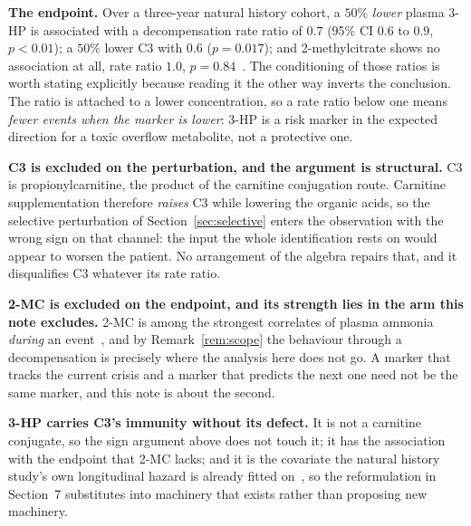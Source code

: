 \textbf{The endpoint.} Over a three-year natural history cohort, a $50\%$ \emph{lower}
plasma 3-HP is associated with a decompensation rate ratio of $0.7$ (95\% CI $0.6$ to $0.9$,
$p<0.01$); a $50\%$ lower C3 with $0.6$ ($p=0.017$); and 2-methylcitrate shows no
association at all, rate ratio $1.0$, $p=0.84$~\cite{natural_history}. %
The conditioning of those ratios is worth stating explicitly because reading it the other
way inverts the conclusion. The ratio is attached to a lower concentration, so a rate ratio
below one means \emph{fewer events when the marker is lower}: 3-HP is a risk marker in the
expected direction for a toxic overflow metabolite, not a protective one.

\textbf{C3 is excluded on the perturbation, and the argument is structural.} C3 is
propionylcarnitine, the product of the carnitine conjugation route. Carnitine
supplementation therefore \emph{raises} C3 while lowering the organic acids, so the
selective perturbation of Section~\ref{sec:selective} enters the observation with the wrong
sign on that channel: the input the whole identification rests on would appear to worsen the
patient. No arrangement of the algebra repairs that, and it disqualifies C3 whatever its
rate ratio.

\textbf{2-MC is excluded on the endpoint, and its strength lies in the arm this note
excludes.} 2-MC is among the strongest correlates of plasma ammonia \emph{during} an
event~\cite{amd_phenotyping}, %
and by Remark~\ref{rem:scope} the behaviour through a decompensation is precisely where the
analysis here does not go. A marker that tracks the current crisis and a marker that
predicts the next one need not be the same marker, and this note is about the second.

\textbf{3-HP carries C3's immunity without its defect.} It is not a carnitine conjugate, so
the sign argument above does not touch it; it has the association with the endpoint that
2-MC lacks; and it is the covariate the natural history study's own longitudinal hazard is
already fitted on~\cite{natural_history}, %
so the reformulation in Section~7 substitutes into machinery that exists rather than
proposing new machinery.

